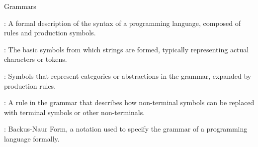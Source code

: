 \documentclass[hidelinks]{article}
\begin{document}
\begin{smodule}[title={Grammars}]{Grammars}

    \begin{sdefinition}[for=Grammar]
        : A formal description of the syntax of a programming language, composed of rules and production symbols.
    \end{sdefinition}

    \begin{sdefinition}[for=TerminalSymbol]
        : The basic symbols from which strings are formed, typically representing actual characters or tokens.
    \end{sdefinition}

    \begin{sdefinition}[for=NonTerminalSymbol]
        : Symbols that represent categories or abstractions in the grammar, expanded by production rules.
    \end{sdefinition}

    \begin{sdefinition}[for=ProductionRule]
        : A rule in the grammar that describes how non-terminal symbols can be replaced with terminal symbols or other non-terminals.
    \end{sdefinition}

    \begin{sdefinition}[for=BNF]
        : Backus-Naur Form, a notation used to specify the grammar of a programming language formally.
    \end{sdefinition}

\end{smodule}
\end{document}
